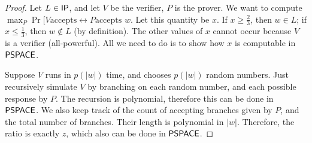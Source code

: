\begin{proof}
Let $L \in {\ensuremath{\mathsf{IP}}}$, and let $V$ be the verifier, $P$ is the prover. We want to compute $\max_{P}\Pr[V \text{accepts} \leftrightarrow P \text{accepts $w$}$. Let this quantity be $x$. If $x \ge \frac{2}{3}$, then $w \in L$; if $x \le \frac{1}{3}$, then $w \notin L$ (by definition). The other values of $x$ cannot occur because $V$ is a verifier (all-powerful). All we need to do is to show how $x$ is computable in ${\mathsf{PSPACE}}$.

\par Suppose $V$ runs in $p(|w|)$ time, and chooses $p(|w|)$ random numbers. Just recursively simulate $V$ by branching on each random number, and each possible response by $P$. The recursion is polynomial, therefore this can be done in ${\mathsf{PSPACE}}$. We also keep track of the count of accepting branches given by $P$, and the total number of branches. Their length is polynomial in $|w|$. Therefore, the ratio is exactly $z$, which also can be done in ${\mathsf{PSPACE}}$.
\end{proof}

